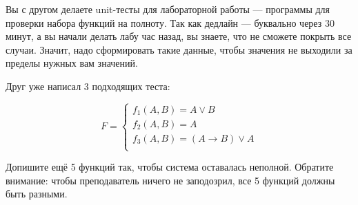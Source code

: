 \question
Вы с другом делаете unit-тесты для лабораторной работы — программы для проверки набора функций на полноту. Так как дедлайн — буквально через 30 минут, а вы начали делать лабу час назад, вы знаете, что не сможете покрыть все случаи. Значит, надо сформировать такие данные, чтобы значения не выходили за пределы нужных вам значений.

Друг уже написал 3 подходящих теста:

\begin{equation*}
    F=
    \begin{cases}
        f_1(A,B)=A \lor B\\
        f_2(A,B)=A\\
        f_3(A,B)=(A \rightarrow B) \lor A\\
    \end{cases}
\end{equation*}
    
Допишите ещё 5 функций так, чтобы система оставалась неполной. Обратите внимание: чтобы преподаватель ничего не заподозрил, все 5 функций должны быть разными.